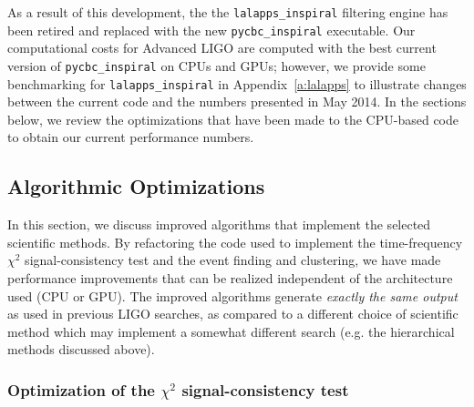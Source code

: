 As a result of this development, the the \texttt{lalapps\_inspiral} filtering
engine has been retired and replaced with the new \texttt{pycbc\_inspiral}
executable. Our computational costs for Advanced LIGO are computed with the
best current version of \texttt{pycbc\_inspiral} on CPUs and GPUs; however, we
provide some benchmarking for \texttt{lalapps\_inspiral} in
Appendix~\ref{a:lalapps} to illustrate
changes between the current code and the numbers presented in May 2014. 
In the
sections below, we review the optimizations that have been made to the
CPU-based code to obtain our current performance numbers. 


\vspace*{-10pt}
\subsection{Algorithmic Optimizations}
\vspace*{-5pt}

In this section, we discuss improved algorithms that implement the selected
scientific methods. By refactoring the code used to implement the
time-frequency $\chi^2$ signal-consistency test and the event finding and
clustering, we have made performance improvements that can be realized
independent of the architecture used (CPU or GPU). The improved algorithms
generate \emph{exactly the same output} as used in previous LIGO searches, as
compared to a different choice of scientific method which may implement a
somewhat different search (e.g. the hierarchical methods discussed above).

\vspace*{-10pt}
\subsubsection{Optimization of the $\chi^2$ signal-consistency test}
\vspace*{-05pt}
\label{sec:opt-chisq}

